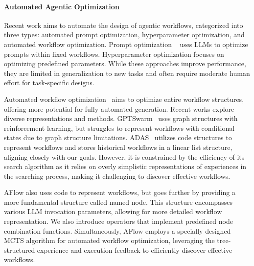 \documentclass{article} %
\newcommand{\model}{{\sc AFlow}\xspace}
\theoremstyle{plain}
\theoremstyle{definition}
\theoremstyle{remark}
\begin{document}
\paragraph{Automated Agentic Optimization}
Recent work aims to automate the design of agentic workflows, categorized into three types: automated prompt optimization, hyperparameter optimization, and automated workflow optimization. Prompt optimization ~\citep{chirs2024probreed, mert2024text, cheng2024opro, omar2024dspy} uses LLMs to optimize prompts within fixed workflows. Hyperparameter optimization \citep{saad2024archon} focuses on optimizing predefined parameters. While these approaches improve performance, they are limited in generalization to new tasks and often require moderate human effort for task-specific designs.

Automated workflow optimization~\citep{ze2024autoflow, wang2024symbo, zhuge2024gptswarm, hu2024automated} aims to optimize entire workflow structures, offering more potential for fully automated generation. Recent works explore diverse representations and methods. GPTSwarm~\citep{zhuge2024gptswarm} uses graph structures with reinforcement learning, but struggles to represent workflows with conditional states due to graph structure limitations. ADAS~\citep{hu2024automated} utilizes code structures to represent workflows and stores historical workflows in a linear list structure, aligning closely with our goals. However, it is constrained by the efficiency of its search algorithm as it relies on overly simplistic representations of experiences in the searching process, making it challenging to discover effective workflows.

\model also uses code to represent workflows, but goes further by providing a more fundamental structure called named node.  This structure encompasses various LLM invocation parameters, allowing for more detailed workflow representation. We also introduce operators that implement predefined node combination functions. Simultaneously, \model employs a specially designed MCTS algorithm for automated workflow optimization, leveraging the tree-structured experience and execution feedback to efficiently discover effective workflows.

\end{document}
